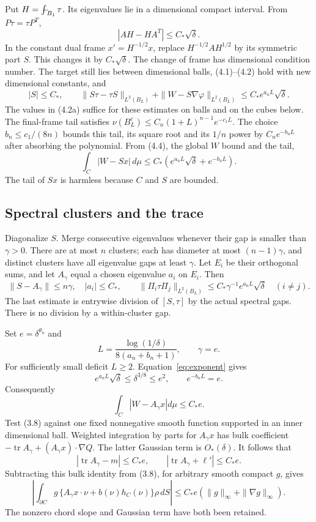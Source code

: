 \documentclass[11pt,reqno]{amsart}
\numberwithin{equation}{section}
\theoremstyle{remark}
\theoremstyle{definition}
\newcommand{\fint}{\mathop{\rlap{\hspace{0.15em}$-$}\!\int}\nolimits}
\begin{document}
Put \(H=\fint_{B_1}\tau\). Its eigenvalues lie in a dimensional compact interval. From \(P\tau=\tau P^T\),
\[
|AH-HA^T|\le C_*\sqrt\delta.
\]
In the constant dual frame \(x'=H^{-1/2}x\), replace \(H^{-1/2}AH^{1/2}\) by its symmetric part \(S\). This changes it by \(C_*\sqrt\delta\). The change of frame has dimensional condition number. The target still lies between dimensional balls, (4.1)--(4.2) hold with new dimensional constants, and
\[
|S|\le C_*,\qquad
\|S\tau-\tau S\|_{L^2(B_L)}
+\|W-S\nabla\varphi\|_{L^2(B_L)}
\le C_*e^{a_nL}\sqrt\delta.                          \tag{4.4}
\]
The values in (4.2a) suffice for these estimates on balls and on the cubes below.
The final-frame tail satisfies
$\nu(B_L^c)\le C_n(1+L)^{n-1}e^{-c_1L}$.
The choice $b_n\le c_1/(8n)$ bounds this tail, its square root and
its $1/n$ power by $C_ne^{-b_nL}$ after absorbing the polynomial.
From (4.4), the global \(W\) bound and the tail,
\[
\int_C|W-Sx|\,d\mu
\le C_*\left(e^{a_nL}\sqrt\delta+e^{-b_nL}\right).       \tag{4.5}
\]
The tail of \(Sx\) is harmless because \(C\) and \(S\) are bounded. 

\subsection{Spectral clusters and the trace}

Diagonalize \(S\). Merge consecutive eigenvalues whenever their gap is smaller than \(\gamma>0\). There are at most \(n\) clusters; each has diameter at most \((n-1)\gamma\), and distinct clusters have all eigenvalue gaps at least \(\gamma\). Let \(E_i\) be their orthogonal sums, and let \(A_\gamma\) equal a chosen eigenvalue \(a_i\) on \(E_i\). Then
\[
\|S-A_\gamma\|\le n\gamma,\quad |a_i|\le C_*,
\qquad
\|\Pi_i\tau\Pi_j\|_{L^2(B_L)}
\le C_*\gamma^{-1}e^{a_nL}\sqrt\delta\quad(i\ne j).     \tag{4.6}
\]
The last estimate is entrywise division of \([S,\tau]\) by the actual spectral gaps. There is no division by a within-cluster gap.

Set \(e=\delta^{\theta_n}\) and
\[
L=\frac{\log(1/\delta)}{8(a_n+b_n+1)},\qquad \gamma=e.
\]
For sufficiently small deficit \(L\ge2\). Equation~\eqref{eq:exponent} gives
\[
e^{a_nL}\sqrt\delta\le\delta^{3/8}\le e^2,\qquad
e^{-b_nL}=e.
\]
Consequently
\[
\int_C|W-A_\gamma x|d\mu\le C_*e.                    \tag{4.7}
\]
Test (3.8) against one fixed nonnegative smooth function supported in an inner dimensional ball. Weighted integration by parts for \(A_\gamma x\) has bulk coefficient
\(-\operatorname{tr}A_\gamma+(A_\gamma x)\cdot\nabla Q\).
The latter Gaussian term is \(O_*(\delta)\). It follows that
\[
|\operatorname{tr}A_\gamma-m|\le C_*e,\qquad
|\operatorname{tr}A_\gamma+\ell'|\le C_*e.             \tag{4.8}
\]
Subtracting this bulk identity from (3.8), for arbitrary smooth compact \(g\), gives
\[
\left|\int_{\partial C}g\,
\{A_\gamma x\cdot\nu+b(\nu)h_C(\nu)\}\rho\,dS\right|
\le C_*e(\|g\|_\infty+\|\nabla g\|_\infty).           \tag{4.9}
\]
The nonzero chord slope and Gaussian term have both been retained.
\end{document}

